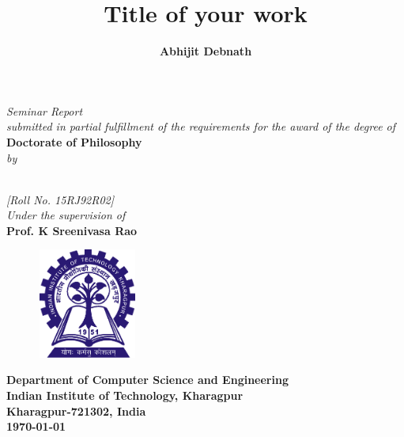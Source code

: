 

\title{\fontsize{16pt}{19.2pt}\selectfont\bf{Title of your work }}
\date{}
\maketitle
\thispagestyle{empty}
\begin{center}
\vspace*{-16mm}
\textit{Seminar Report\\submitted in partial fulfillment of the requirements for the award of the degree of \\}
\vspace*{6mm}
{\fontsize{14pt}{16.8pt}\selectfont\textbf{Doctorate of Philosophy}} \\ 
\vspace*{2mm}
{\fontsize{14pt}{16.8pt}\selectfont\textit{by}} \\
\vspace*{3mm}

\author{\fontsize{14pt}{16.8pt}\selectfont\textbf{Abhijit Debnath}}\\
\vspace*{2mm}
{\fontsize{12pt}{14.4pt}\selectfont\textit{[Roll No. 15RJ92R02]}} \\


\vspace*{4mm}\fontsize{14pt}{16.8pt}\selectfont\textit{Under the supervision of} \\
\vspace*{2mm}\fontsize{14pt}{16.8pt}\selectfont\textbf{Prof. K Sreenivasa Rao} \\
\vspace*{1mm}

\begin{figure}[!ht]
\centering
\includegraphics[height=36.068mm,width=33.274mm]{figures/IIT_Kharagpur_Logo.eps}
\end{figure}
\vspace*{3mm}
\fontsize{14pt}{16.8pt}\selectfont\textbf{Department of Computer Science and Engineering \\
\vspace*{2mm} Indian Institute of Technology, Kharagpur} \\
\vspace*{2mm}
\fontsize{14pt}{16.8pt}\selectfont\textbf{Kharagpur-721302, India} \\
\vspace*{2mm}
\fontsize{14pt}{16.8pt}\selectfont\textbf{\today}
\end{center}

